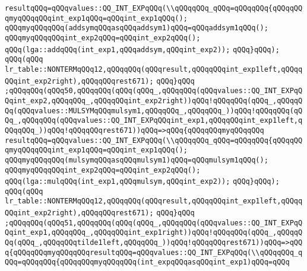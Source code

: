 \verb|resultqQQq=qQQqvalues::QQ_INT_EXPqQQq(\\qQQqqQQq_qQQq=qQQqqQQq{qQQqqQQqmyqQQqqQQqint_exp1qQQq=qQQqint_exp1qQQq();|\newline
\verb|qQQqmyqQQqqQQq(addsymqQQqasqQQqaddsym1)qQQq=qQQqaddsym1qQQq();|\newline
\verb|qQQqmyqQQqqQQqint_exp2qQQq=qQQqint_exp2qQQq();|\newline
\verb|qQQq(lga::addqQQq(int_exp1,qQQqaddsym,qQQqint_exp2));|\newline
\verb|qQQq}qQQq);|\newline
\verb|qQQq(qQQq|\newline
\verb|lr_table::NONTERMqQQq12,qQQqqQQq(qQQqresult,qQQqqQQqint_exp1left,qQQqqQQqint_exp2right),qQQqqQQqrest671);|\newline
\verb|qQQq}qQQq|\newline
\verb|;qQQqqQQq(qQQq50,qQQqqQQq(qQQq(qQQq_,qQQqqQQq(qQQqvalues::QQ_INT_EXPqQQqint_exp2,qQQqqQQq_,qQQqqQQqint_exp2right))qQQq!qQQqqQQq(qQQq_,qQQqqQQq(qQQqvalues::MULSYMqQQqmulsym1,qQQqqQQq_,qQQqqQQq_))qQQq!qQQqqQQq(qQQq_,qQQqqQQq(qQQqvalues::QQ_INT_EXPqQQqint_exp1,qQQqqQQqint_exp1left,qQQqqQQq_))qQQq!qQQqqQQqrest671))qQQq=>qQQq{qQQqqQQqmyqQQqqQQq|\newline
\verb|resultqQQq=qQQqvalues::QQ_INT_EXPqQQq(\\qQQqqQQq_qQQq=qQQqqQQq{qQQqqQQqmyqQQqqQQqint_exp1qQQq=qQQqint_exp1qQQq();|\newline
\verb|qQQqmyqQQqqQQq(mulsymqQQqasqQQqmulsym1)qQQq=qQQqmulsym1qQQq();|\newline
\verb|qQQqmyqQQqqQQqint_exp2qQQq=qQQqint_exp2qQQq();|\newline
\verb|qQQq(lga::mulqQQq(int_exp1,qQQqmulsym,qQQqint_exp2));|\newline
\verb|qQQq}qQQq);|\newline
\verb|qQQq(qQQq|\newline
\verb|lr_table::NONTERMqQQq12,qQQqqQQq(qQQqresult,qQQqqQQqint_exp1left,qQQqqQQqint_exp2right),qQQqqQQqrest671);|\newline
\verb|qQQq}qQQq|\newline
\verb|;qQQqqQQq(qQQq51,qQQqqQQq(qQQq(qQQq_,qQQqqQQq(qQQqvalues::QQ_INT_EXPqQQqint_exp1,qQQqqQQq_,qQQqqQQqint_exp1right))qQQq!qQQqqQQq(qQQq_,qQQqqQQq(qQQq_,qQQqqQQqtilde1left,qQQqqQQq_))qQQq!qQQqqQQqrest671))qQQq=>qQQq{qQQqqQQqmyqQQqqQQqresultqQQq=qQQqvalues::QQ_INT_EXPqQQq(\\qQQqqQQq_qQQq=qQQqqQQq{qQQqqQQqmyqQQqqQQq(int_expqQQqasqQQqint_exp1)qQQq=qQQq|\newline
